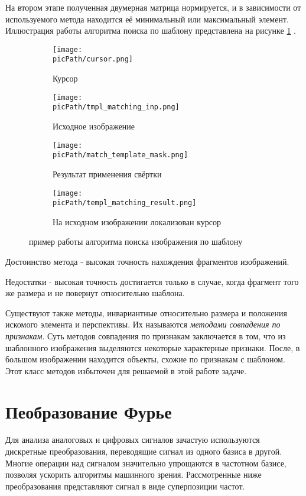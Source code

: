 \documentclass[oneside,final,14pt]{extreport}
\newcommand{\picPath}{pictures}
\begin{document}
На втором этапе полученная двумерная матрица нормируется, и в зависимости от используемого метода находится её минимальный или максимальный элемент. Иллюстрация работы алгоритма поиска по шаблону представлена на рисунке \ref{fig:templateMatching} .

\begin{figure}[H]
  \centering
  \begin{subfigure}[b]{0.2\linewidth}
    \texttt{[image: \\picPath/cursor.png]}
    \caption{ Курсор}
  \end{subfigure}
  \begin{subfigure}[b]{0.4\linewidth}
    \texttt{[image: \\picPath/tmpl\_matching\_inp.png]}
    \caption{Исходное изображение}
  \end{subfigure}
  \begin{subfigure}[b]{0.4\linewidth}
    \texttt{[image: \\picPath/match\_template\_mask.png]}
    \caption{Результат применения свёртки \phantom{локализован курсор}}
  \end{subfigure}
  \begin{subfigure}[b]{0.4\linewidth}
    \texttt{[image: \\picPath/templ\_matching\_result.png]}
    \caption{На исходном изображении локализован курсор}
  \end{subfigure}
  \caption{пример работы алгоритма поиска изображения по шаблону}
  \label{fig:templateMatching}
\end{figure}

Достоинство метода  - высокая точность нахождения фрагментов изображений.

Недостатки - высокая точность достигается только в случае, когда фрагмент того же размера и не повернут относительно шаблона. 
	
	Существуют также методы, инвариантные относительно размера и положения искомого элемента и перспективы. Их называются \textit{методами совпадения по признакам}. Суть методов совпадения по признакам заключается в том, что из шаблонного изображения выделяются некоторые характерные признаки. После, в большом изображении находится объекты, схожие по признакам с шаблоном. Этот  класс методов избыточен для решаемой в этой работе задаче.
	
\chapter{Пеобразование Фурье}
Для анализа аналоговых и цифровых сигналов зачастую используются дискретные преобразования, переводящие сигнал из одного базиса в другой. Многие операции над сигналом значительно упрощаются в частотном базисе, позволяя ускорить алгоритмы машинного зрения. Рассмотренные ниже преобразования представляют сигнал в виде суперпозиции частот. 
\end{document}
